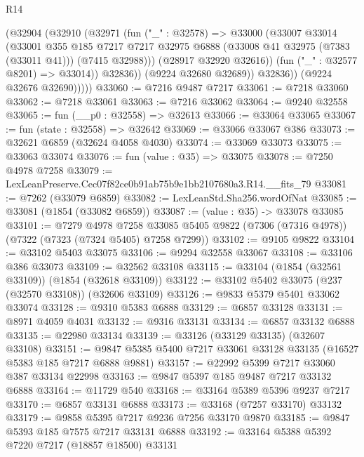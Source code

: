 \begin{lexlean}{R14}
\begin{coremodule}
                  (@32904
                    (@32910
                      (@32971
                        (fun ("_" : @32578) =>
                        @33000
                          (@33007
                            @33014
                            (@33001
                              @355
                              @185
                              @7217
                              @7217
                              @32975
                              @6888
                              (@33008 @41 @32975 (@7383 (@33011 @41)))
                              (@7415 @32988)))
                          (@28917 @32920 @32616))
                        (fun ("_" : @32577 @8201) => @33014))
                      @32836))
                  (@9224 @32680 @32689))
                @32836))
            (@9224 @32676 @32690)))))
@33060 := @7216 @9487 @7217
@33061 := @7218 @33060
@33062 := @7218 @33061
@33063 := @7216 @33062
@33064 := @9240 @32558
@33065 := fun (__p0 : @32558) => @32613
@33066 := @33064 @33065
@33067 := fun (state : @32558) => @32642
@33069 := @33066 @33067 @386
@33073 := @32621 @6859 (@32624 @4058 @4030)
@33074 := @33069 @33073
@33075 := @33063 @33074
@33076 := fun (value : @35) => @33075
@33078 := @7250 @4978 @7258
@33079 := LexLeanPreserve.Cec07f82ce0b91ab75b9e1bb2107680a3.R14.__fits_79
@33081 := @7262 (@33079 @6859)
@33082 := LexLeanStd.Sha256.wordOfNat
@33085 := @33081 (@1854 (@33082 @6859))
@33087 := (value : @35) -> @33078 @33085
@33101 := @7279
    @4978
    @7258
    @33085
    @5405
    @9822
    (@7306 (@7316 @4978))
    (@7322 (@7323 (@7324 @5405) @7258 @7299))
@33102 := @9105 @9822
@33104 := @33102 @5403 @33075
@33106 := @9294 @32558 @33067
@33108 := @33106 @386 @33073
@33109 := @32562 @33108
@33115 := @33104 (@1854 (@32561 @33109)) (@1854 (@32618 @33109))
@33122 := @33102 @5402 @33075 (@237 (@32570 @33108)) (@32606 @33109)
@33126 := @9833 @5379 @5401 @33062 @33074
@33128 := @9310 @5383 @6888
@33129 := @6857 @33128
@33131 := @8971 @4059 @4031
@33132 := @9316 @33131
@33134 := @6857 @33132 @6888
@33135 := @22980 @33134
@33139 := @33126 (@33129 @33135) (@32607 @33108)
@33151 := @9847 @5385 @5400 @7217 @33061 @33128 @33135 (@16527 @5383 @185 @7217 @6888 @9881)
@33157 := @22992 @5399 @7217 @33060 @387 @33134 @22998
@33163 := @9847 @5397 @185 @9487 @7217 @33132 @6888
@33164 := @11729 @540
@33168 := @33164 @5389 @5396 @9237 @7217
@33170 := @6857 @33131 @6888
@33173 := @33168 (@7257 @33170) @33132
@33179 := @9858 @5395 @7217 @9236 @7256 @33170 @9870
@33185 := @9847 @5393 @185 @7575 @7217 @33131 @6888
@33192 := @33164 @5388 @5392 @7220 @7217 (@18857 @18500) @33131

\end{coremodule}
\end{lexlean}
